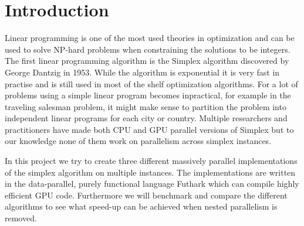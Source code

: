\section{Introduction}
Linear programming is one of the most used theories in optimization and can be used to solve NP-hard problems when constraining the solutions to be integers. The first linear programming algorithm is the Simplex algorithm discovered by George Dantzig in 1953. While the algorithm is exponential it is very fast in practise and is still used in most of the shelf optimization algorithms. For a lot of problems using a simple linear program becomes inpractical, for example in the traveling salesman problem, it might make sense to partition the problem into independent linear programs for each city or country. Multiple researchers and practitioners have made both CPU and GPU parallel versions of Simplex but to our knowledge none of them work on parallelism across simplex instances.

\newpar In this project we try to create three different massively parallel implementations of the simplex algorithm on multiple instances. The implementations are written in the data-parallel, purely functional language Futhark which can compile highly efficient GPU code. Furthermore we will benchmark and compare the different algorithms to see what speed-up can be achieved when nested parallelism is removed. 
